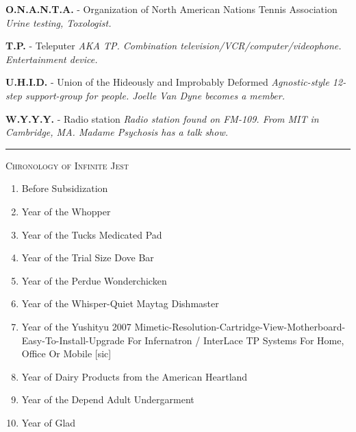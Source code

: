 \documentclass{article}
\begin{document}
\begin{tcolorbox}[height=25.5cm]
\vspace{0.1cm}

\textbf{O.N.A.N.T.A.} - Organization of North American Nations Tennis Association
\vspace{0.1cm}
\newline
\emph{Urine testing, Toxologist.}
\newline

\textbf{T.P.} - Teleputer
\vspace{0.1cm}
\newline
\emph{AKA TP. Combination television/VCR/computer/videophone. Entertainment device.}
\newline

\textbf{U.H.I.D.} - Union of the Hideously and Improbably Deformed
\vspace{0.1cm}
\newline
\emph{Agnostic-style 12-step support-group for people. Joelle Van Dyne becomes a member.}
\newline

\textbf{W.Y.Y.Y.} - Radio station
\vspace{0.1cm}
\newline
\emph{Radio station found on FM-109. From MIT in Cambridge, MA. Madame Psychosis has a talk show.}

\centering
\vspace{0.2cm}
\rule{\textwidth}{1pt}\newline
\vspace{0.2cm}
\newline
\huge\textsc{Chronology of Infinite Jest}
\small
\vspace{0.1cm}
\decorule
\vspace{0.1cm}
\begin{flushleft}
\begin{enumerate}
\item Before Subsidization
\item Year of the Whopper 
\item Year of the Tucks Medicated Pad
\item Year of the Trial Size Dove Bar 
\item Year of the Perdue Wonderchicken
\item Year of the Whisper-Quiet Maytag Dishmaster
\item Year of the Yushityu 2007 Mimetic-Resolution-Cartridge-View-Motherboard-Easy-To-Install-Upgrade For Infernatron / InterLace TP Systems For Home, Office Or Mobile [sic]
\item Year of Dairy Products from the American Heartland
\item Year of the Depend Adult Undergarment
\item Year of Glad
\end{enumerate}
\end{flushleft}
\end{tcolorbox}
\end{document}
